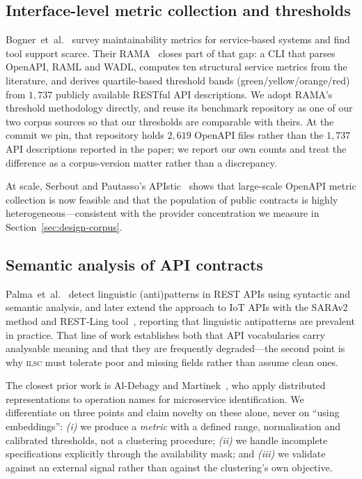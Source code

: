 \documentclass[journal]{IEEEtran}
\newcommand{\ilsc}{\textsc{ilsc}}
\begin{document}
\subsection{Interface-level metric collection and thresholds}
Bogner~et~al.~\cite{bogner2017automatically} survey maintainability metrics for
service-based systems and find tool support scarce. Their
RAMA~\cite{bogner2020rama} closes part of that gap: a CLI that parses OpenAPI,
RAML and WADL, computes ten structural service metrics from the literature, and
derives quartile-based threshold bands (green/yellow/orange/red) from $1{,}737$
publicly available RESTful API descriptions. We adopt RAMA's threshold
methodology directly, and reuse its benchmark repository as one of our two
corpus sources so that our thresholds are comparable with theirs. At the commit
we pin, that repository holds $2{,}619$ OpenAPI files rather than the $1{,}737$
API descriptions reported in the paper; we report our own counts and treat the
difference as a corpus-version matter rather than a discrepancy.

At scale, Serbout and Pautasso's APIstic~\cite{apistic2024} shows that
large-scale OpenAPI metric collection is now feasible and that the population of
public contracts is highly heterogeneous---consistent with the provider
concentration we measure in Section~\ref{sec:design-corpus}.

\subsection{Semantic analysis of API contracts}
Palma~et~al.~\cite{palma2015restful} detect linguistic (anti)patterns in REST
APIs using syntactic and semantic analysis, and later extend the approach to IoT
APIs with the SARAv2 method and REST-Ling tool~\cite{palma2022linguistic},
reporting that linguistic antipatterns are prevalent in practice. That line of
work establishes both that API vocabularies carry analysable meaning and that
they are frequently degraded---the second point is why \ilsc{} must tolerate
poor and missing fields rather than assume clean ones.

The closest prior work is Al-Debagy and
Martinek~\cite{aldebagy2020extracting}, who apply distributed representations
to operation names for microservice identification. We differentiate on three
points and claim novelty on these alone, never on ``using embeddings'':
\emph{(i)} we produce a \emph{metric} with a defined range, normalisation and
calibrated thresholds, not a clustering procedure; \emph{(ii)} we handle
incomplete specifications explicitly through the availability mask; and
\emph{(iii)} we validate against an external signal rather than against the
clustering's own objective.
\end{document}

